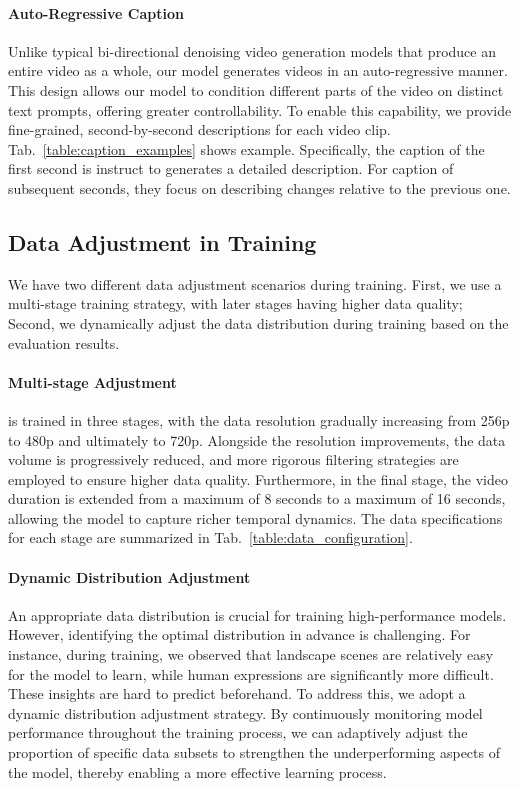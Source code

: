 

\paragraph{Auto-Regressive Caption}
Unlike typical bi-directional denoising video generation models that produce an entire video as a whole, our model generates videos in an auto-regressive manner. This design allows our model to condition different parts of the video on distinct text prompts, offering greater controllability.  
To enable this capability, we provide fine-grained, second-by-second descriptions for each video clip. Tab.~\ref{table:caption_examples} shows example. Specifically, the caption of the first second is instruct to generates a detailed description. For caption of subsequent seconds, they focus on describing changes relative to the previous one. 


\subsection{Data Adjustment in Training}
\label{sec:data_adjustment}
We have two different data adjustment scenarios during training. First, we use a multi-stage training strategy, with later stages having higher data quality; Second, we dynamically adjust the data distribution during training based on the evaluation results. 

\paragraph{Multi-stage Adjustment}
\magi is trained in three stages, with the data resolution gradually increasing from 256p to 480p and ultimately to 720p. Alongside the resolution improvements, the data volume is progressively reduced, and more rigorous filtering strategies are employed to ensure higher data quality. Furthermore, in the final stage, the video duration is extended from a maximum of 8 seconds to a maximum of 16 seconds, allowing the model to capture richer temporal dynamics. The data specifications for each stage are summarized in Tab.~\ref{table:data_configuration}.

\paragraph{Dynamic Distribution Adjustment}
An appropriate data distribution is crucial for training high-performance models. However, identifying the optimal distribution in advance is challenging. For instance, during training, we observed that landscape scenes are relatively easy for the model to learn, while human expressions are significantly more difficult. These insights are hard to predict beforehand. To address this, we adopt a dynamic distribution adjustment strategy. By continuously monitoring model performance throughout the training process, we can adaptively adjust the proportion of specific data subsets to strengthen the underperforming aspects of the model, thereby enabling a more effective learning process.
